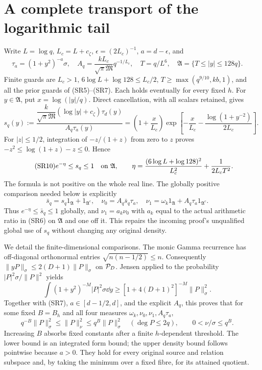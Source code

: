 \section{A complete transport of the logarithmic tail}
Write $L=\log q$, $L_c=L+c_\zeta$, $\epsilon=(2L_c)^{-1}$,
$a=d-\epsilon$, and
\begin{equation}\tag{SR8}
 \tau_a=(1+y^2)^{-a}\sigma,\quad
 A_q=\frac{kL_c}{\sqrt\pi\mathfrak M}q^{-1/L_c},\quad
 T=q/L^6,\quad \mathfrak A=\{T\le |y|\le128q\}.
\end{equation}
Finite guards are $L_c>1$, $6\log L+\log128\le L_c/2$,
$T\ge\max(q^{9/10},kb,1)$, and all the prior guards of (SR5)--(SR7).
Each holds eventually for every fixed $h$. For $y\in\mathfrak A$, put
$x=\log(|y|/q)$. Direct cancellation, with all scalars retained, gives
\begin{equation}\tag{SR9}
 s_q(y):=\frac{\dfrac{k}{\sqrt\pi\mathfrak M}
 (\log|y|+c_\zeta)\tau_d(y)}{A_q\tau_a(y)}
 =\left(1+\frac{x}{L_c}\right)
 \exp\left[-\frac{x}{L_c}
 -\frac{\log(1+y^{-2})}{2L_c}\right].
\end{equation}
For $|z|\le1/2$, integration of $-z/(1+z)$ from zero to $z$ proves
$-z^2\le\log(1+z)-z\le0$. Hence
\begin{equation}\tag{SR10}
 e^{-\eta}\le s_q\le1\quad\hbox{on }\mathfrak A,
 \qquad \eta=\frac{(6\log L+\log128)^2}{L_c^2}
                   +\frac1{2L_cT^2}.
\end{equation}
The formula is not positive on the whole real line. The globally positive
comparison needed below is explicitly
\begin{equation}\tag{SR11}
 \bar s_q=s_q1_{\mathfrak A}+1_{\mathfrak A^c},\quad
 \nu_0=A_q\bar s_q\tau_a,\quad
 \nu_1=\omega_k1_{\mathfrak A}+A_q\tau_a1_{\mathfrak A^c}.
\end{equation}
Thus $e^{-\eta}\le\bar s_q\le1$ globally, and
$\nu_1=a_k\nu_0$ with $a_k$ equal to the actual arithmetic ratio in (SR6)
on $\mathfrak A$ and one off it. This repairs the incoming proof's unqualified
global use of $s_q$ without changing any original density.

We detail the finite-dimensional comparisons. The monic Gamma recurrence
has off-diagonal orthonormal entries $\sqrt{n(n-1/2)}\le n$.
Consequently $\|yP\|_\sigma\le2(D+1)\|P\|_\sigma$ on $\mathcal P_D$.
Jensen applied to the probability $|P|^2\sigma/\|P\|^2$ yields
\begin{equation}\tag{SR12}
 \int(1+y^2)^{-M}|P|^2\sigma\dd y
 \ge[1+4(D+1)^2]^{-M}\|P\|_\sigma^2.
\end{equation}
Together with (SR7), $a\in[d-1/2,d]$, and the explicit $A_q$, this proves
that for some fixed $B=B_h$ and all four measures
$\omega_k,\nu_0,\nu_1,A_q\tau_a$,
\begin{equation}\tag{SR13}
 q^{-B}\|P\|_\sigma^2\le\|P\|_\nu^2\le q^B\|P\|_\sigma^2
 \quad(\deg P\le2q),\qquad 0<\nu/\sigma\le q^B.
\end{equation}
Increasing $B$ absorbs fixed constants after a finite $h$-dependent threshold.
The lower bound is an integrated form bound; the upper density bound follows
pointwise because $a>0$. They hold for every original source and relation
subspace and, by taking the minimum over a fixed fibre, for its attained quotient.

